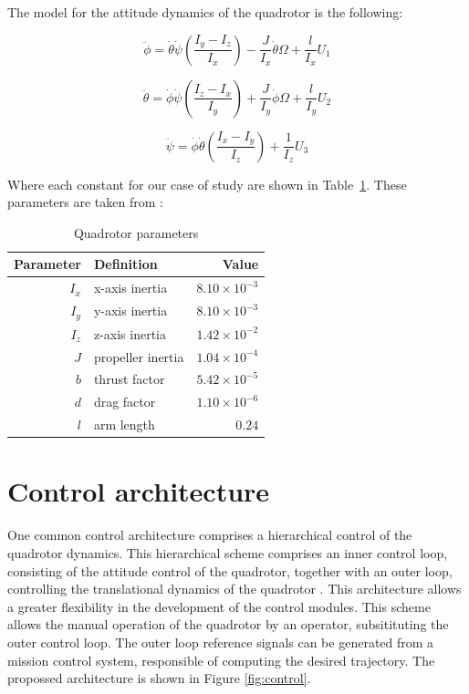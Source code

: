 \documentclass[12pt]{article}
\begin{document}
The model for the attitude dynamics of the quadrotor is the following:

\begin{equation}
\label{eq:dyn-roll}
\ddot{\phi} = \dot{\theta} \dot{\psi} \left ( \frac{I_y-I_z}{I_x} \right ) - \frac{J}{I_x} \dot{\theta} \Omega + \frac{l}{I_x} U_1
\end{equation}

\begin{equation}
\label{eq:dyn-pitch}
\ddot{\theta} = \dot{\phi} \dot{\psi} \left ( \frac{I_z-I_x}{I_y} \right ) + \frac{J}{I_y} \dot{\phi} \Omega + \frac{l}{I_y} U_2
\end{equation}

\begin{equation}
\label{eq:dyn-yaw}
\ddot{\psi} = \dot{\phi} \dot{\theta} \left ( \frac{I_x-I_y}{I_z} \right ) + \frac{1}{I_z} U_3
\end{equation}

Where each constant for our case of study are shown in Table~\ref{tab:parameters}. These parameters are taken from \cite{Merh14} :

\begin{table}
  \begin{center}
    \caption{Quadrotor parameters}\label{tab:parameters}
    \begin{tabular}{rlr}
      \hline
      Parameter & Definition & Value \\
      \hline                  
      $I_x$ & x-axis inertia & $8.10 \times {10}^{-3}$\\
      $I_y$ & y-axis inertia & $8.10 \times {10}^{-3}$\\
      $I_z$ & z-axis inertia & $1.42 \times {10}^{-2}$ \\
      $J$ & propeller inertia & $1.04 \times {10}^{-4}$ \\
      $b$ & thrust factor & $ 5.42 \times {10}^{-5}$ \\
      $d$ & drag factor & $ 1.10 \times{10}^{-6}$ \\
      $l$ & arm length & $0.24$ \\
      \hline
    \end{tabular}
  \end{center}
\end{table}

\section{Control architecture}
One common control architecture comprises a hierarchical control of the quadrotor dynamics. This hierarchical scheme comprises an inner control loop, consisting of the attitude control of the quadrotor, together with an outer loop, controlling the translational dynamics of the quadrotor \cite{Raff10}. This architecture allows a greater flexibility in the development of the control modules. This scheme allows the manual operation of the quadrotor by an operator, subsitituting the outer control loop. The outer loop reference signals can be generated from a mission control system, responsible of computing the desired trajectory. The propossed architecture is shown in Figure \ref{fig:control}.
\end{document}
